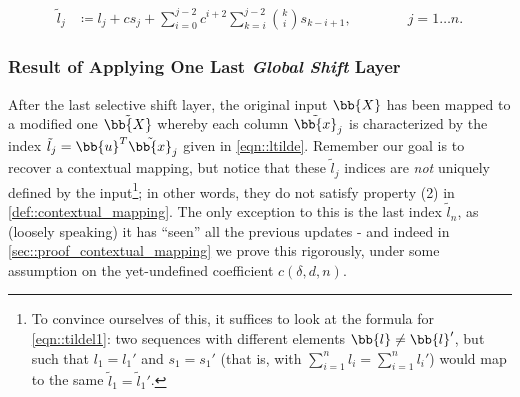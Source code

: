 \begin{equation}
\begin{split}
    \tilde{l}_j &\coloneqq l_j + cs_j +\sum_{i=0}^{j-2}c^{i+2}\sum_{k=i}^{j-2}\binom{k}{i}s_{k-i+1}, \qquad\qquad j=1\dots n.
    \label{eqn::ltilde}
\end{split}
\end{equation}


\subsubsection{Result of Applying One Last \emph{Global Shift} Layer}
After the last selective shift layer, the original input $\bb{X}$ has been mapped to a modified one $\tilde{\bb{X}}$ whereby each column $\tilde{\bb{x}}_j$ is characterized by the index $\tilde{l}_j=\bb{u}^T\tilde{\bb{x}}_j$ given in \cref{eqn::ltilde}. Remember our goal is to recover a contextual mapping, but notice that these $\tilde{l}_j$ indices are \emph{not} uniquely defined by the input\footnote{To convince ourselves of this, it suffices to look at the formula for \cref{eqn::tildel1}: two sequences with different elements $\bb{l}\neq\bb{l}'$, but such that $l_1=l_1'$ and $s_1=s_1'$ (that is, with $\sum_{i=1}^n l_i=\sum_{i=1}^n l_i'$) would map to the same $\tilde{l}_1=\tilde{l}_1'$.}; in other words, they do not satisfy property (2) in \cref{def::contextual_mapping}. The only exception to this is the last index $\tilde{l}_n$, as (loosely speaking) it has ``seen'' all the previous updates - and indeed in \cref{sec::proof_contextual_mapping} we prove this rigorously, under some assumption on the yet-undefined coefficient $c(\delta,d,n)$.

